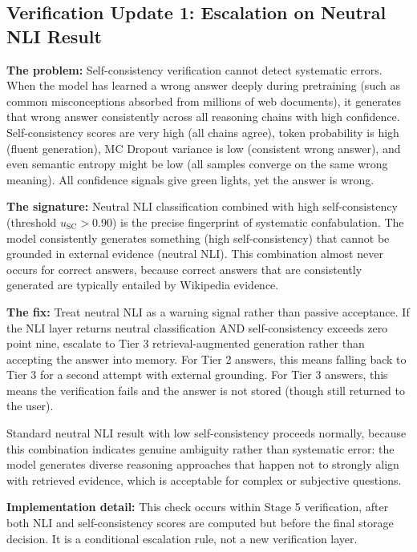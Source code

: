 \documentclass[11pt,a4paper]{article}
\newcommand{\architecturebox}[2]{%
\begin{tcolorbox}[enhanced,breakable,
  colback=LightTeal,colframe=Teal,boxrule=1.5pt,arc=4pt,
  left=8pt,right=8pt,top=6pt,bottom=6pt,
  title={\bfseries\small\color{white}#1},
  attach boxed title to top left={yshift=-2mm,xshift=6mm},
  boxed title style={colback=Teal,arc=3pt,boxrule=0pt,
    left=4pt,right=4pt,top=2pt,bottom=2pt}]
#2
\end{tcolorbox}}
\begin{document}
\subsection{Verification Update 1: Escalation on Neutral NLI Result}

\architecturebox{VERIFICATION UPDATE 1: Neutral NLI Escalation for Systematic Confabulation}{
\textbf{The problem:} Self-consistency verification cannot detect systematic errors. When the model has learned a wrong answer deeply during pretraining (such as common misconceptions absorbed from millions of web documents), it generates that wrong answer consistently across all reasoning chains with high confidence. Self-consistency scores are very high (all chains agree), token probability is high (fluent generation), MC Dropout variance is low (consistent wrong answer), and even semantic entropy might be low (all samples converge on the same wrong meaning). All confidence signals give green lights, yet the answer is wrong.

\textbf{The signature:} Neutral NLI classification combined with high self-consistency (threshold $u_{\text{SC}} > 0.90$) is the precise fingerprint of systematic confabulation. The model consistently generates something (high self-consistency) that cannot be grounded in external evidence (neutral NLI). This combination almost never occurs for correct answers, because correct answers that are consistently generated are typically entailed by Wikipedia evidence.

\textbf{The fix:} Treat neutral NLI as a warning signal rather than passive acceptance. If the NLI layer returns neutral classification AND self-consistency exceeds zero point nine, escalate to Tier 3 retrieval-augmented generation rather than accepting the answer into memory. For Tier 2 answers, this means falling back to Tier 3 for a second attempt with external grounding. For Tier 3 answers, this means the verification fails and the answer is not stored (though still returned to the user).

Standard neutral NLI result with low self-consistency proceeds normally, because this combination indicates genuine ambiguity rather than systematic error: the model generates diverse reasoning approaches that happen not to strongly align with retrieved evidence, which is acceptable for complex or subjective questions.

\textbf{Implementation detail:} This check occurs within Stage 5 verification, after both NLI and self-consistency scores are computed but before the final storage decision. It is a conditional escalation rule, not a new verification layer.

}
\end{document}
